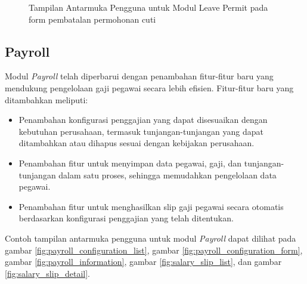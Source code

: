 \begin{figure}
\centering
{}
\caption{Tampilan Antarmuka Pengguna untuk Modul Leave Permit pada form pembatalan permohonan cuti}
\label{fig:leave_permit_cancel}
\end{figure}

\subsection{Payroll}
Modul \textit{Payroll} telah diperbarui dengan penambahan fitur-fitur baru yang mendukung pengelolaan gaji pegawai secara lebih efisien. Fitur-fitur baru yang ditambahkan meliputi:
\begin{itemize}
    \item Penambahan konfigurasi penggajian yang dapat disesuaikan dengan kebutuhan perusahaan, termasuk tunjangan-tunjangan yang dapat ditambahkan atau dihapus sesuai dengan kebijakan perusahaan.
    \item Penambahan fitur untuk menyimpan data pegawai, gaji, dan tunjangan-tunjangan dalam satu proses, sehingga memudahkan pengelolaan data pegawai.
    \item Penambahan fitur untuk menghasilkan slip gaji pegawai secara otomatis berdasarkan konfigurasi penggajian yang telah ditentukan.
\end{itemize}
Contoh tampilan antarmuka pengguna untuk modul \textit{Payroll} dapat dilihat pada gambar \ref{fig:payroll_configuration_list}, gambar  \ref{fig:payroll_configuration_form}, gambar  \ref{fig:payroll_information}, gambar \ref{fig:salary_slip_list}, dan gambar \ref{fig:salary_slip_detail}.

